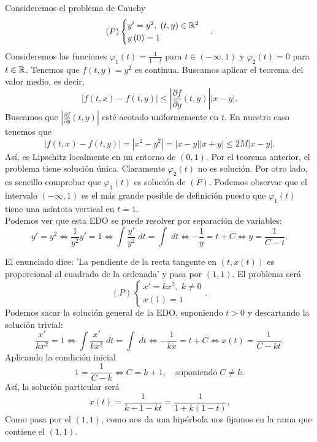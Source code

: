 \begin{eg}
Consideremos el problema de Cauchy
	\[ \left(P\right) 
	\begin{cases}
	y' = y^{2}, \; \left(t,y\right) \in \mathbb{R}^{2} \\
	y\left(0\right) = 1
	\end{cases}
	.\]
Consideremos las funciones $\displaystyle \varphi_{1}\left(t\right) = \frac{1}{1-t} $ para $\displaystyle t \in \left(-\infty, 1\right) $ y $\displaystyle \varphi_{2}\left(t\right) = 0 $ para $\displaystyle t \in \mathbb{R} $. Tenemos que $\displaystyle f\left(t,y\right)=y^{2} $ es continua. Buscamos aplicar el teorema del valor medio, es decir, 
\[ \left|f\left(t,x\right)-f\left(t,y\right)\right| \leq \left|\frac{\partial f}{\partial y}\left(t,y\right)\right| \left|x-y\right| .\]
Buscamos que $\displaystyle \left|\frac{\partial f}{\partial y}\left(t,y\right)\right| $ esté acotado uniformemente en $\displaystyle t $. En nuestro caso tenemos que 
\[ \left|f\left(t,x\right)-f\left(t,y\right)\right| = \left|x^{2}-y^{2}\right| = \left|x-y\right| \left|x + y\right|\leq 2M \left|x-y\right| .\]
Así, es Lipschitz localmente en un entorno de $\displaystyle \left(0,1\right) $. Por el teorema anterior, el problema tiene solución única. Claramente $\displaystyle \varphi_{2}\left(t\right) $ no es solución. Por otro lado, es sencillo comprobar que $\displaystyle \varphi_{1}\left(t\right) $ es solución de $\displaystyle \left(P\right) $. Podemos observar que el intervalo $\displaystyle \left(-\infty, 1\right) $ es el más grande posible de definición puesto que $\displaystyle \varphi_{1}\left(t\right) $ tiene una asíntota vertical en $\displaystyle t = 1 $. \\
Podemos ver que esta EDO se puede resolver por separación de variables:
\[ y' = y^{2} \iff \frac{1}{y^{2}}y' = 1 \iff \int \frac{y'}{y^{2}} \; dt = \int  \; dt \iff -\frac{1}{y} = t + C \iff y = \frac{1}{C - t} .\]
\end{eg}
\begin{eg}
El enunciado dice: 'La pendiente de la recta tangente en $\displaystyle \left(t, x\left(t\right)\right) $ es proporcional al cuadrado de la ordenada' y pasa por $\displaystyle \left(1,1\right) $. El problema será
\[ \left(P\right)
\begin{cases}
x' = k x^{2}, \; k \neq 0 \\
x\left(1\right) = 1
\end{cases}
.\]
Podemos sacar la solución general de la EDO, suponiendo $\displaystyle t > 0 $ y descartando la solución trivial:
\[\frac{x'}{kx^{2}} = 1 \iff \int \frac{x'}{kx^{2}} \; dt = \int  \; dt \iff -\frac{1}{kx} = t + C \iff x\left(t\right)=\frac{1}{C - kt} .\]
Aplicando la condición inicial
\[1 = \frac{1}{C - k} \iff C = k + 1 , \quad \text{suponiendo} \; C \neq k.\]
Así, la solución particular será
\[ x\left(t\right)=\frac{1}{k + 1 - kt} = \frac{1}{1 + k\left(1-t\right)} .\]
Como pasa por el $\displaystyle \left(1,1\right) $, como nos da una hipérbola nos fijamos en la rama que contiene el $\displaystyle \left(1,1\right) $. 
\end{eg}
